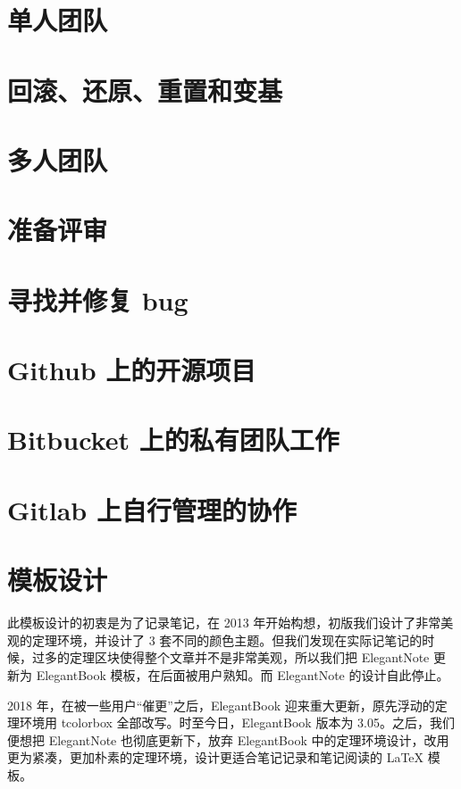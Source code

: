 \documentclass[cn,pad,11pt,green,geye]{../elegantnote}
\begin{document}
\section{单人团队}

\section{回滚、还原、重置和变基}

\section{多人团队}

\section{准备评审}

\section{寻找并修复 bug}

\section{Github 上的开源项目}

\section{Bitbucket 上的私有团队工作}

\section{Gitlab 上自行管理的协作}


\section{模板设计}
此模板设计的初衷是为了记录笔记，在 2013 年开始构想，初版我们设计了非常美观的定理环境，并设计了 3 套不同的颜色主题。但我们发现在实际记笔记的时候，过多的定理区块使得整个文章并不是非常美观，所以我们把 ElegantNote 更新为 ElegantBook 模板，在后面被用户熟知。而 ElegantNote 的设计自此停止。

2018 年，在被一些用户“催更”之后，ElegantBook 迎来重大更新，原先浮动的定理环境用 tcolorbox 全部改写。时至今日，ElegantBook 版本为 3.05。之后，我们便想把 ElegantNote 也彻底更新下，放弃 ElegantBook 中的定理环境设计，改用更为紧凑，更加朴素的定理环境，设计更适合笔记记录和笔记阅读的 \LaTeX{} 模板。
\end{document}
